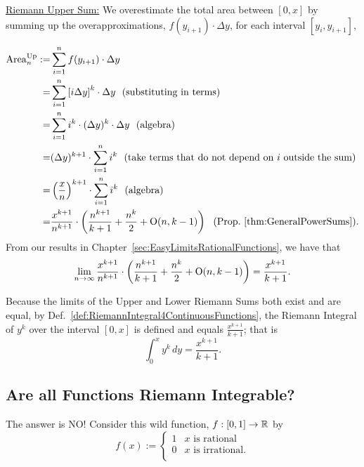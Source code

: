 \underline{Riemann Upper Sum:} We overestimate the  total area between $[0, x]$ by summing up the overapproximations, $f(y_{i+1})\cdot \Delta y$, for each interval $[y_i, y_{i+1}]$,

        \begin{equation}
        \begin{aligned}
            {\rm Area}^{\rm Up}_n : =& \sum_{i=1}^n f(y_{i+1})\cdot \Delta y \\
            =& \sum_{i=1}^n \left[  i \Delta y \right]^k\cdot \Delta y ~~(\text{substituting in terms})\\
            =&  \sum_{i=1}^n   i^k \cdot  (\Delta y)^k \cdot \Delta y ~~(\text{algebra})\\
            =& (\Delta y)^{k+1} \cdot \sum_{i=1}^n   i^k ~~(\text{take terms that do not depend on $i$ outside the sum})\\
            =&  \left( \frac{x}{n} \right)^{k+1} \cdot \sum_{i=1}^{n}   i^k ~~(\text{algebra}) \\
            =& \frac{x^{k+1} }{n^{k+1} }\cdot \left( \frac{n^{k+1}}{k+1} + \frac{n^k}{2} + \mathrm{O}(n,k-1) \right) ~~({\rm Prop}.~\ref{thm:GeneralPowerSums}).
        \end{aligned}            
        \end{equation}
        From our results in Chapter~\ref{sec:EasyLimitsRationalFunctions}, we have that
 \begin{equation}
     \lim_{n \to \infty} \frac{x^{k+1} }{n^{k+1} }\cdot \left( \frac{n^{k+1}}{k+1} + \frac{n^k}{2} + \mathrm{O}(n,k-1) \right) =  \frac{ x^{k+1} }{k+1}.
 \end{equation}

 Because the limits of the Upper and Lower Riemann Sums both exist and are equal, by Def.~\ref{def:RiemannIntegral4ContinuousFunctions}, the Riemann Integral of $y^k$ over the interval $[0, x]$ is defined and equals $ \frac{ x^{k+1} }{k+1}$; that is
 \begin{equation}
     \int_0^x y^k \, dy =  \frac{ x^{k+1} }{k+1}.
 \end{equation}

 \Qed

 \subsection{Are all Functions Riemann Integrable?}

 The answer is NO! Consider this wild function, $f:[0, 1] \to \mathbb R$ by
 \begin{equation}
     f(x) := \begin{cases}
         1 & x \text{ is rational} \\
         0 & x \text{ is irrational}. \\
     \end{cases}
 \end{equation}

